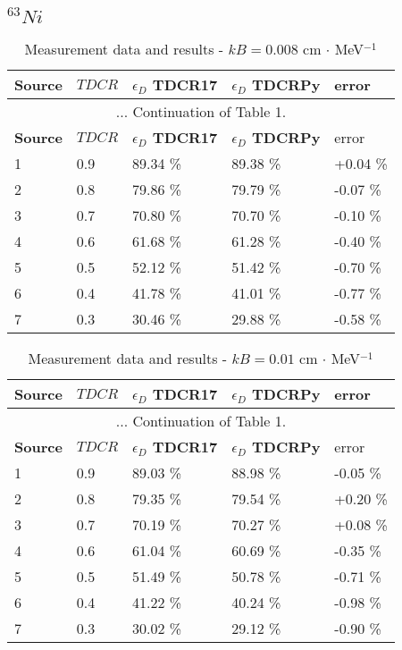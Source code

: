 \documentclass[12pt]{iopart}
\begin{document}
\subsection{$^{63}Ni$}

\begingroup
\footnotesize
\begin{longtable}[l]{| p{} | p{} |p{} |p{} |p{} |} 
\caption{Measurement data and results - $kB = 0.008$ cm $\cdot$ MeV$^{-1}$}
\label{Table1} \\ 
\hline
\textbf{Source} & \textbf{$TDCR$} & \textbf{$\epsilon_{D}$ TDCR17} & \textbf{$\epsilon_{D}$ TDCRPy} & error \\
\endfirsthead
\multicolumn{5}{c}{... Continuation of Table 1.}\\ 
\hline
 \textbf{Source} & \textbf{$TDCR$} & \textbf{$\epsilon_{D}$ TDCR17} & \textbf{$\epsilon_{D}$ TDCRPy} & error \\   \hline 
\endhead
\hline
 1 & 0.9   &   89.34 \% &   89.38 \% &  +0.04 \% \\
 2 & 0.8   &   79.86 \% &   79.79 \% &  -0.07 \% \\
 3 & 0.7   &   70.80 \% &   70.70 \% &  -0.10 \% \\
 4 & 0.6   &   61.68 \% &   61.28 \% &  -0.40 \% \\
 5 & 0.5   &   52.12 \% &   51.42 \% &  -0.70 \% \\
 6 & 0.4   &   41.78 \% &   41.01 \% &  -0.77 \% \\
 7 & 0.3   &   30.46 \% &   29.88 \% &  -0.58 \% \\
\hline
\end{longtable} 
\endgroup

\pagebreak

\begingroup
\footnotesize
\begin{longtable}[l]{| p{} | p{} | p{} |p{} |p{} |} 
\caption{Measurement data and results - $kB = 0.01$ cm $\cdot$ MeV$^{-1}$}
\label{Table1} \\ 
\hline
\textbf{Source} & \textbf{$TDCR$} & \textbf{$\epsilon_{D}$ TDCR17} & \textbf{$\epsilon_{D}$ TDCRPy} & error \\ 
\endfirsthead
\multicolumn{5}{c}{... Continuation of Table 1.}\\ 
\hline
 \textbf{Source} & \textbf{$TDCR$} & \textbf{$\epsilon_{D}$ TDCR17} & \textbf{$\epsilon_{D}$ TDCRPy} & error \\   \hline 
\endhead
\hline
 1 &  0.9  &  89.03 \% &   88.98 \% & -0.05 \% \\
 2 &  0.8  &  79.35 \% &   79.54 \% & +0.20 \% \\
 3 &  0.7  &  70.19 \% &   70.27 \% & +0.08 \% \\
 4 &  0.6  &  61.04 \% &   60.69 \% & -0.35 \% \\
 5 &  0.5  &  51.49 \% &   50.78 \% & -0.71 \% \\
 6 &  0.4  &  41.22 \% &   40.24 \% & -0.98 \% \\
 7 &  0.3  &  30.02 \% &   29.12 \% & -0.90 \% \\
\hline
\end{longtable} 
\endgroup
\end{document}

